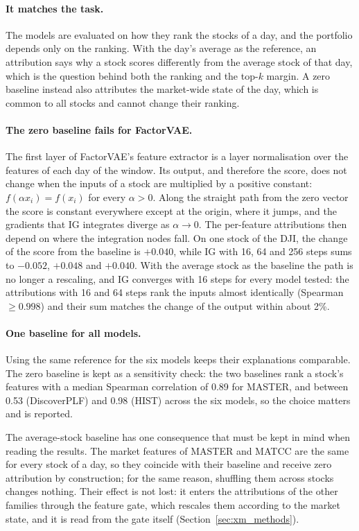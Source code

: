 \paragraph{It matches the task.} The models are evaluated on how they rank the stocks of a day, and the portfolio depends only on the ranking. With the day's average as the reference, an attribution says why a stock scores differently from the average stock of that day, which is the question behind both the ranking and the top-$k$ margin. A zero baseline instead also attributes the market-wide state of the day, which is common to all stocks and cannot change their ranking.

\paragraph{The zero baseline fails for FactorVAE.} The first layer of FactorVAE's feature extractor is a layer normalisation over the features of each day of the window. Its output, and therefore the score, does not change when the inputs of a stock are multiplied by a positive constant: $f(\alpha x_i) = f(x_i)$ for every $\alpha > 0$. Along the straight path from the zero vector the score is constant everywhere except at the origin, where it jumps, and the gradients that IG integrates diverge as $\alpha \to 0$. The per-feature attributions then depend on where the integration nodes fall. On one stock of the DJI, the change of the score from the baseline is $+0.040$, while IG with 16, 64 and 256 steps sums to $-0.052$, $+0.048$ and $+0.040$. With the average stock as the baseline the path is no longer a rescaling, and IG converges with 16 steps for every model tested: the attributions with 16 and 64 steps rank the inputs almost identically (Spearman $\geq 0.998$) and their sum matches the change of the output within about 2\%. %

\paragraph{One baseline for all models.} Using the same reference for the six models keeps their explanations comparable. The zero baseline is kept as a sensitivity check: the two baselines rank a stock's features with a median Spearman correlation of 0.89 for MASTER, and between 0.53 (DiscoverPLF) and 0.98 (HIST) across the six models, so the choice matters and is reported.

The average-stock baseline has one consequence that must be kept in mind when reading the results. The market features of MASTER and MATCC are the same for every stock of a day, so they coincide with their baseline and receive zero attribution by construction; for the same reason, shuffling them across stocks changes nothing. Their effect is not lost: it enters the attributions of the other families through the feature gate, which rescales them according to the market state, and it is read from the gate itself (Section~\ref{sec:xm_methods}).

